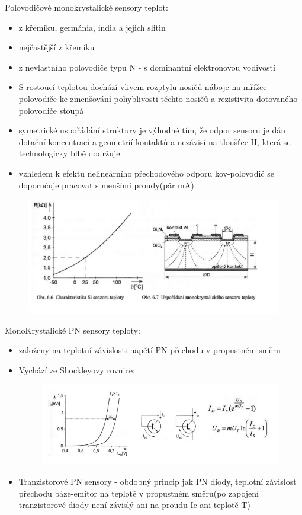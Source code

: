 Polovodičové monokrystalické sensory teplot:
\begin{itemize}
    \item z křemíku, germánia, india a jejich slitin
    \item nejčastější z křemíku
    \item z nevlastního polovodiče typu N - s dominantní elektronovou vodivostí
    \item S rostoucí teplotou dochází vlivem rozptylu nosičů náboje na mřížce polovodiče ke zmenšování pohyblivosti těchto nosičů a rezistivita dotovaného polovodiče stoupá
    \item symetrické uspořádání struktury je výhodné tím, že odpor sensoru je dán dotační koncentrací a geometrií kontaktů a nezávisí na tloušťce H, která se technologicky blbě dodržuje
    \item vzhledem k efektu nelineárního přechodového odporu kov-polovodič se doporučuje pracovat s menšími proudy(pár mA)
\end{itemize}
\begin{figure}[H]
    \includegraphics*[scale = 1.2]{img/odporoveSnimaceSi.png}
\end{figure}

MonoKrystalické PN sensory teploty:
\begin{itemize}
    \item založeny na teplotní závislosti napětí PN přechodu v propustném směru
    \item Vychází ze Shockleyovy rovnice:
          \begin{figure}[H]
              \includegraphics*[scale = 1.2]{img/odporoveSnimacePN.png}
          \end{figure}
    \item Tranzistorové PN sensory - obdobný princip jak PN diody, teplotní závislost přechodu báze-emitor na teplotě v propustném směru(po zapojení tranzistorové diody není závislý ani na proudu Ic ani teplotě T)
\end{itemize}

